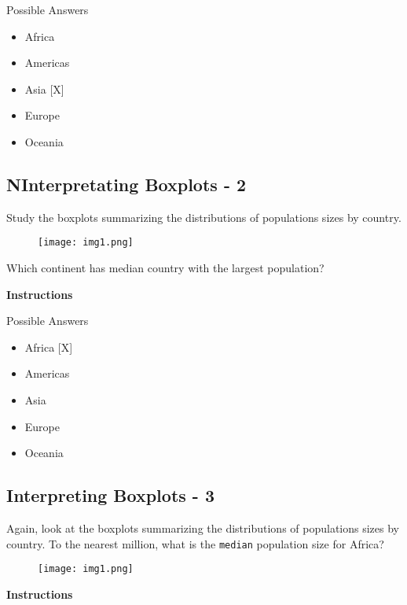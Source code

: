 \documentclass[]{article}
\providecommand{\tightlist}{%
  \setlength{\itemsep}{0pt}\setlength{\parskip}{0pt}}
\begin{document}
Possible Answers

\begin{itemize}
\tightlist
\item
  Africa
\item
  Americas
\item
  Asia {[}X{]}
\item
  Europe
\item
  Oceania
\end{itemize}

\subsection{\texorpdfstring{\textbf{NInterpretating Boxplots -
2}}{NInterpretating Boxplots - 2}}\label{ninterpretating-boxplots---2}

Study the boxplots summarizing the distributions of populations sizes by
country.

\begin{figure}
\centering
\texttt{[image: img1.png]}
\caption{}
\end{figure}

Which continent has median country with the largest population?

\textbf{Instructions}

Possible Answers

\begin{itemize}
\tightlist
\item
  Africa {[}X{]}
\item
  Americas
\item
  Asia
\item
  Europe
\item
  Oceania
\end{itemize}

\subsection{\texorpdfstring{\textbf{Interpreting Boxplots -
3}}{Interpreting Boxplots - 3}}\label{interpreting-boxplots---3}

Again, look at the boxplots summarizing the distributions of populations
sizes by country. To the nearest million, what is the \texttt{median}
population size for Africa?

\begin{figure}
\centering
\texttt{[image: img1.png]}
\caption{}
\end{figure}

\textbf{Instructions}
\end{document}
